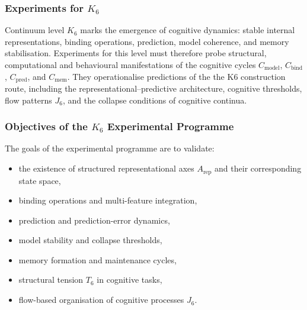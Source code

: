 
\subsubsection{Experiments for \texorpdfstring{$K_6$}{K_6}}
\label{sec:experiments-k6}

Continuum level $K_6$ marks the emergence of cognitive dynamics:
stable internal representations, binding operations, prediction,
model coherence, and memory stabilisation.
Experiments for this level must therefore probe structural,
computational and behavioural manifestations of the cognitive
cycles $C_{\mathrm{model}}$, $C_{\mathrm{bind}}$,
$C_{\mathrm{pred}}$, and $C_{\mathrm{mem}}$.
They operationalise predictions of the the K6 construction route, including
the representational–predictive architecture, cognitive thresholds,
flow patterns $J_6$, and the collapse conditions of cognitive continua.



\subsubsection{Objectives of the \texorpdfstring{$K_6$}{K_6} Experimental Programme}

The goals of the experimental programme are to validate:

\begin{itemize}
    \item the existence of structured representational axes
          $A_{\mathrm{rep}}$ and their corresponding state space,
    \item binding operations and multi-feature integration,
    \item prediction and prediction-error dynamics,
    \item model stability and collapse thresholds,
    \item memory formation and maintenance cycles,
    \item structural tension $T_6$ in cognitive tasks,
    \item flow-based organisation of cognitive processes $J_6$.
\end{itemize}



